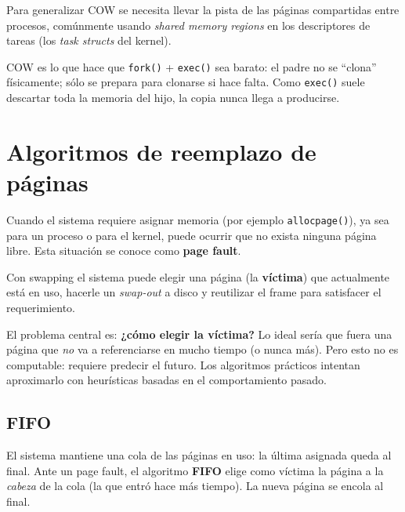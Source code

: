 \documentclass[11pt,a4paper]{article}
\begin{document}
Para generalizar COW se necesita llevar la pista de las páginas
compartidas entre procesos, comúnmente usando \emph{shared memory
regions} en los descriptores de tareas (los \emph{task structs} del
kernel).

\begin{idea}
COW es lo que hace que \texttt{fork()} + \texttt{exec()} sea barato: el
padre no se ``clona'' físicamente; sólo se prepara para clonarse si
hace falta. Como \texttt{exec()} suele descartar toda la memoria del
hijo, la copia nunca llega a producirse.
\end{idea}

\section{Algoritmos de reemplazo de páginas}

Cuando el sistema requiere asignar memoria (por ejemplo
\verb|allocpage()|), ya sea para un proceso o para el kernel, puede
ocurrir que no exista ninguna página libre. Esta situación se conoce
como \textbf{page fault}.

Con swapping el sistema puede elegir una página (la \textbf{víctima})
que actualmente está en uso, hacerle un \emph{swap-out} a disco y
reutilizar el frame para satisfacer el requerimiento.

\begin{importante}
El problema central es: \textbf{¿cómo elegir la víctima?} Lo ideal
sería que fuera una página que \emph{no} va a referenciarse en mucho
tiempo (o nunca más). Pero esto no es computable: requiere predecir el
futuro. Los algoritmos prácticos intentan aproximarlo con heurísticas
basadas en el comportamiento pasado.
\end{importante}

\subsection{FIFO}

El sistema mantiene una cola de las páginas en uso: la última asignada
queda al final. Ante un page fault, el algoritmo \textbf{FIFO} elige
como víctima la página a la \emph{cabeza} de la cola (la que entró hace
más tiempo). La nueva página se encola al final.
\end{document}
